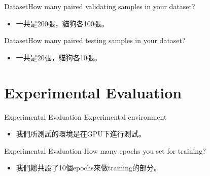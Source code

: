 \documentclass{beamer}
\begin{document}
\begin{frame}{Dataset}{How many paired validating samples in your dataset?}
\begin{CJK*}{UTF8}{bsmi}
  \begin{itemize}
  \item {
     一共是200張，貓狗各100張。
  }
  \end{itemize}
\end{CJK*}
\end{frame}

\begin{frame}{Dataset}{How many paired testing samples in your dataset?}
\begin{CJK*}{UTF8}{bsmi}
  \begin{itemize}
  \item {
    一共是20張，貓狗各10張。
  }
  \end{itemize}
\end{CJK*}
\end{frame}




\section{ Experimental Evaluation }

\begin{frame}{ Experimental Evaluation }{Experimental environment}
\begin{CJK*}{UTF8}{bsmi}
  \begin{itemize}
  \item {
    我們所測試的環境是在GPU下進行測試。
  }
  \end{itemize}
\end{CJK*}
\end{frame}

\begin{frame}{ Experimental Evaluation }{How many epochs you set for training?}
\begin{CJK*}{UTF8}{bsmi}
  \begin{itemize}
  \item {
   我們總共設了10個epochs來做training的部分。
  }
  \end{itemize}
\end{CJK*}
\end{frame}
\end{document}
